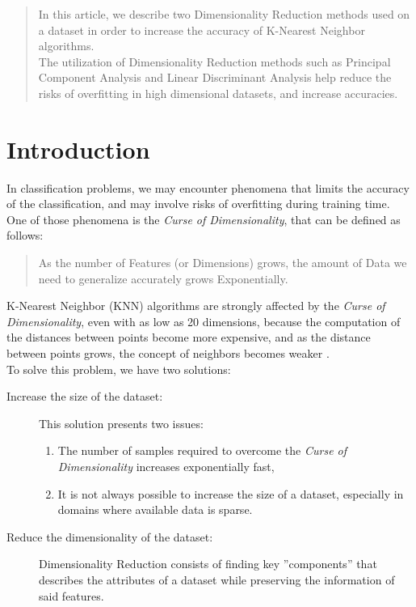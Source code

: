 	\begin{abstract}
		In this article, we describe two Dimensionality Reduction methods used on a dataset in order to increase the accuracy of K-Nearest Neighbor algorithms.\\
		The utilization of Dimensionality Reduction methods such as Principal Component Analysis and Linear Discriminant Analysis help reduce the risks of overfitting in high dimensional datasets, and increase accuracies.
	\end{abstract}
	
	\section{Introduction}
	In classification problems, we may encounter phenomena that limits the accuracy of the classification, and may involve risks of overfitting during training time.\\
	One of those phenomena is the \textit{Curse of Dimensionality}, that can be defined as follows:
	\begin{quote}
		As the number of Features (or Dimensions) grows, the amount of Data we need to generalize accurately grows Exponentially.
	\end{quote}
	K-Nearest Neighbor (KNN) algorithms are strongly affected by the \textit{Curse of Dimensionality}, even with as low as 20 dimensions, because the computation of the distances between points become more expensive, and as the distance between points grows, the concept of neighbors becomes weaker \cite{Beyer1998}.\\
	To solve this problem, we have two solutions:
	\begin{description}
		\item[Increase the size of the dataset:] This solution presents two issues:
		\begin{enumerate}
			\item The number of samples required to overcome the \textit{Curse of Dimensionality} increases exponentially fast,
			\item It is not always possible to increase the size of a dataset, especially in domains where available data is sparse.
		\end{enumerate}
		\item[Reduce the dimensionality of the dataset:] Dimensionality Reduction consists of finding key ''components'' that describes the attributes of a dataset while preserving the information of said features.
	\end{description}
	
